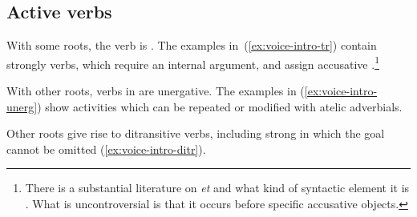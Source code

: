 	\subsection{Active verbs}
With some roots, the verb is . The examples in~(\ref{ex:voice-intro-tr}) contain strongly  verbs, which require an internal argument, and assign accusative .\footnote{There is a substantial literature on \emph{et} and what kind of syntactic element it is \citep{siloni97,danon01,borer13oup}. What is uncontroversial is that it occurs before specific accusative objects.}
 \begin{exe}
 \ex \label{ex:voice-intro-tr} 
 \begin{xlist} 
	
	
 \z
\z 

With other roots, verbs in {\tkal} are unergative. The examples in (\ref{ex:voice-intro-unerg}) show activities which can be repeated or modified with atelic adverbials.
 \begin{exe}
 \ex \label{ex:voice-intro-unerg} 
 \begin{xlist} 
	
	
 \z
\z 

Other roots give rise to ditransitive verbs, including strong  in which the goal cannot be omitted (\ref{ex:voice-intro-ditr}).
 \begin{exe}
 \ex \label{ex:voice-intro-ditr} 
 \begin{xlist} 
	

\end{xlist}
\end{exe}
\end{xlist}
\end{exe}
\end{xlist}
\end{exe}
